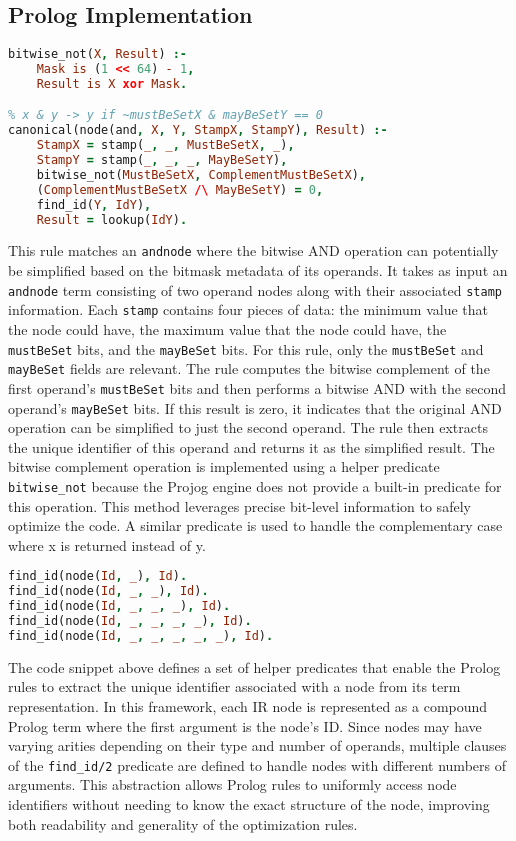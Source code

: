 \subsection*{Prolog Implementation}
\begin{lstlisting}[language=Prolog]
% Complement of a bitmask
bitwise_not(X, Result) :-
    Mask is (1 << 64) - 1,
    Result is X xor Mask.

% x & y -> y if ~mustBeSetX & mayBeSetY == 0
canonical(node(and, X, Y, StampX, StampY), Result) :-
    StampX = stamp(_, _, MustBeSetX, _),
    StampY = stamp(_, _, _, MayBeSetY),
    bitwise_not(MustBeSetX, ComplementMustBeSetX),
    (ComplementMustBeSetX /\ MayBeSetY) = 0,
    find_id(Y, IdY),
    Result = lookup(IdY).
\end{lstlisting}
This rule matches an \texttt{andnode} where the bitwise AND operation can potentially be simplified based on the bitmask metadata of its operands. 
It takes as input an \texttt{andnode} term consisting of two operand nodes along with their associated \texttt{stamp} information. 
Each \texttt{stamp} contains four pieces of data: the minimum value that the node could have, the maximum value that the node could have, the \texttt{mustBeSet} bits, and the \texttt{mayBeSet} bits. 
For this rule, only the \texttt{mustBeSet} and \texttt{mayBeSet} fields are relevant. 
The rule computes the bitwise complement of the first operand’s \texttt{mustBeSet} bits and then performs a bitwise AND with the second operand’s \texttt{mayBeSet} bits. 
If this result is zero, it indicates that the original AND operation can be simplified to just the second operand. 
The rule then extracts the unique identifier of this operand and returns it as the simplified result. 
The bitwise complement operation is implemented using a helper predicate \texttt{bitwise\_not} because the Projog engine does not provide a built-in predicate for this operation. 
This method leverages precise bit-level information to safely optimize the code.
A similar predicate is used to handle the complementary case where x is returned instead of y.

\begin{lstlisting}[language=Prolog]
% These predicates are used to find the ID of a node.
find_id(node(Id, _), Id).
find_id(node(Id, _, _), Id).
find_id(node(Id, _, _, _), Id).
find_id(node(Id, _, _, _, _), Id).
find_id(node(Id, _, _, _, _, _), Id).
\end{lstlisting}

The code snippet above defines a set of helper predicates that enable the Prolog rules to extract the unique identifier associated with a node from its term representation.
In this framework, each IR node is represented as a compound Prolog term where the first argument is the node's ID.
Since nodes may have varying arities depending on their type and number of operands, multiple clauses of the \texttt{find\_id/2} predicate are defined to handle nodes with different numbers of arguments. 
This abstraction allows Prolog rules to uniformly access node identifiers without needing to know the exact structure of the node, improving both readability and generality of the optimization rules.


